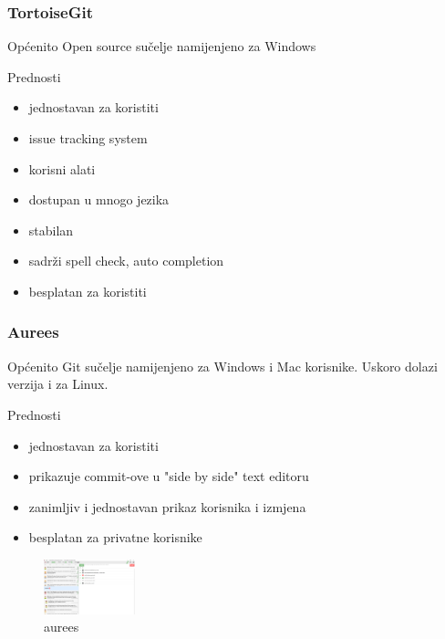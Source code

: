 \documentclass[hyperref={bookmarks=false},aspectratio=169]{beamer}
\begin{document}
\begin{frame}
\frametitle{TortoiseGit}

\begin{block}{\tiny{Općenito}}
Open source sučelje namijenjeno za Windows
\end{block}
\begin{block}{Prednosti}

    \begin{itemize}
    \item jednostavan za koristiti 
    \item issue tracking system
    \item korisni alati
    \item dostupan u mnogo jezika
    \item stabilan
    \item sadrži spell check, auto completion
    \item besplatan za koristiti
    \end{itemize}
\end{block}
\end{frame}

\begin{frame}
\frametitle{Aurees}

    
\begin{block}{\tiny{Općenito}}
Git sučelje namijenjeno za Windows i Mac korisnike. Uskoro dolazi verzija i za Linux.
\end{block}

\begin{block}{Prednosti}
    
    \begin{itemize}
        \item jednostavan za koristiti
        \item prikazuje commit-ove u "side by side" text editoru
        \item zanimljiv i jednostavan prikaz korisnika i izmjena
        \item besplatan za privatne korisnike
    \end{itemize}
\end{block}
\begin{figure}
    \centering
    \includegraphics[width=100]{./figures/aurees.png}
    \caption{aurees}
\end{figure}
\end{frame}
\end{document}
